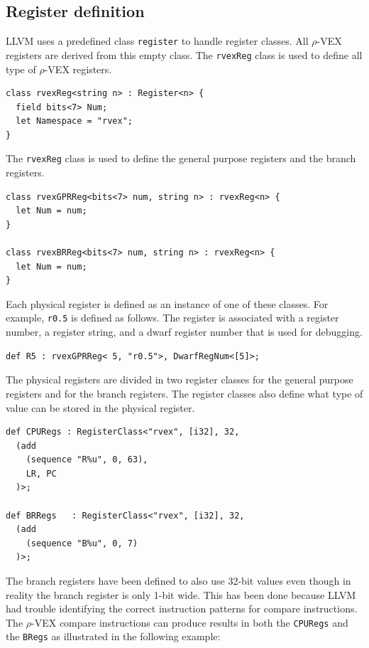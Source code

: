 \subsection{Register definition}
LLVM uses a predefined class \texttt{register} to handle register classes. All $\rho$-VEX registers are derived from this empty class. The \texttt{rvexReg} class is used to define all type of $\rho$-VEX registers. 

\begin{lstlisting}[language=tblgen, caption={Register class definition}]
class rvexReg<string n> : Register<n> {
  field bits<7> Num;
  let Namespace = "rvex";
}
\end{lstlisting}

\pagebreak

The \texttt{rvexReg} class is used to define the general purpose registers and the branch registers.
\begin{lstlisting}[language=tblgen, caption={$\rho$-VEX register types}]
class rvexGPRReg<bits<7> num, string n> : rvexReg<n> {
  let Num = num;
}

class rvexBRReg<bits<7> num, string n> : rvexReg<n> {
  let Num = num;
}
\end{lstlisting}

Each physical register is defined as an instance of one of these classes. For example, \texttt{r0.5} is defined as follows. The register is associated with a register number, a register string, and a dwarf register number that is used for debugging.

\begin{lstlisting}[language=tblgen, caption={$\rho$-VEX register}]
def R5 : rvexGPRReg< 5, "r0.5">, DwarfRegNum<[5]>;
\end{lstlisting}

The physical registers are divided in two register classes for the general purpose registers and for the branch registers. The register classes also define what type of value can be stored in the physical register.

\begin{lstlisting}[language=tblgen, caption={$\rho$-VEX register classes}]
def CPURegs : RegisterClass<"rvex", [i32], 32, 
  (add
    (sequence "R%u", 0, 63),
    LR, PC
  )>;

def BRRegs   : RegisterClass<"rvex", [i32], 32, 
  (add 
    (sequence "B%u", 0, 7)
  )>;
\end{lstlisting}

The branch registers have been defined to also use 32-bit values even though in reality the branch register is only 1-bit wide. This has been done because LLVM had trouble identifying the correct instruction patterns for compare instructions. The $\rho$-VEX compare instructions can produce results in both the \texttt{CPURegs} and the \texttt{BRegs} as illustrated in the following example:

